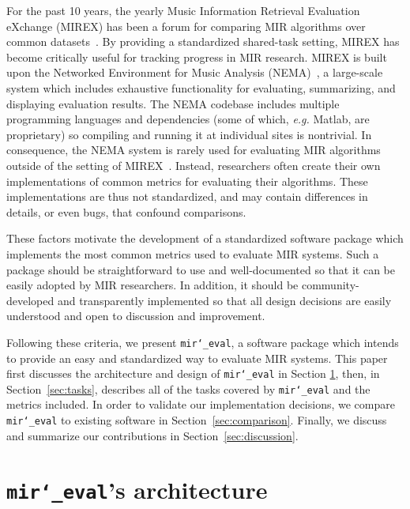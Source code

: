 \documentclass{article}
\def\eg{\emph{e.g.}}
\def\mireval{\texttt{mir\char`_eval}}
\begin{document}
For the past 10 years, the yearly Music Information Retrieval Evaluation eXchange
(MIREX) has been a forum for comparing MIR algorithms over common datasets~\cite{downie2008music}.
By providing a standardized shared-task setting, MIREX has become critically useful for tracking progress in MIR research.
MIREX is built upon the Networked Environment for Music Analysis (NEMA)~\cite{west2010networked}, a large-scale system which includes exhaustive functionality for evaluating, summarizing, and displaying evaluation results.
The NEMA codebase includes multiple programming languages and dependencies (some of which, \eg{} Matlab, are proprietary) so compiling and running it at individual sites is nontrivial.
%
In consequence, the NEMA system is rarely used for evaluating MIR algorithms outside of
the setting of MIREX~\cite{downie2008music}.
Instead, researchers often create their own implementations of common metrics for evaluating their algorithms.
These implementations are thus not standardized, and may contain differences in details, or even bugs, that confound comparisons.

These factors motivate the development of a standardized software package which implements the most common metrics used to evaluate MIR systems.
Such a package should be straightforward to use and well-documented so that it can be easily adopted by MIR researchers.
In addition, it should be community-developed and transparently implemented so that all design decisions are easily understood and open to discussion and improvement.

Following these criteria, we present \mireval{}, a software package which intends to provide an easy and standardized way to evaluate MIR systems.
This paper first discusses the architecture and design of \mireval{} in Section
\ref{sec:architecture}, then, in Section~\ref{sec:tasks}, describes all of the tasks covered by \mireval{} and the metrics included.
In order to validate our implementation decisions, we compare \mireval{} to existing
software in Section~\ref{sec:comparison}.
Finally, we discuss and summarize our contributions in Section~\ref{sec:discussion}.

\section{\mireval{}'s architecture}
\label{sec:architecture}
\end{document}
